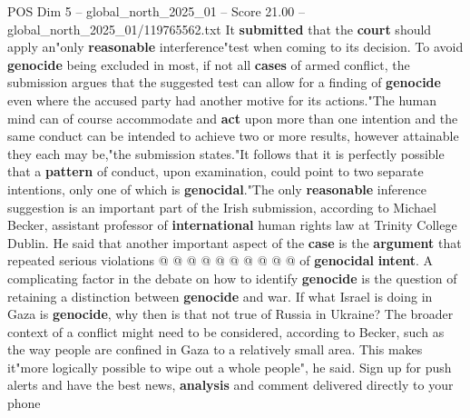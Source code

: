 \begin{textsample}{POS Dim 5 – global\_north\_2025\_01 – Score 21.00 – global\_north\_2025\_01/119765562.txt}
It \textbf{submitted} that the \textbf{court} should apply an"only \textbf{reasonable} interference"test when coming to its decision.
To avoid \textbf{genocide} being excluded in most, if not all \textbf{cases} of armed conflict, the submission argues that the suggested test can allow for a finding of \textbf{genocide} even where the accused party had another motive for its actions."The human mind can of course accommodate and \textbf{act} upon more than one intention and the same conduct can be intended to achieve two or more results, however attainable they each may be,"the submission states."It follows that it is perfectly possible that a \textbf{pattern} of conduct, upon examination, could point to two separate intentions, only one of which is \textbf{genocidal}."The only \textbf{reasonable} inference suggestion is an important part of the Irish submission, according to Michael Becker, assistant professor of \textbf{international} human rights law at Trinity College Dublin.
He said that another important aspect of the \textbf{case} is the \textbf{argument} that repeated serious violations @ @ @ @ @ @ @ @ @ @ of \textbf{genocidal} \textbf{intent}.
A complicating factor in the debate on how to identify \textbf{genocide} is the question of retaining a distinction between \textbf{genocide} and war.
If what Israel is doing in Gaza is \textbf{genocide}, why then is that not true of Russia in Ukraine?
The broader context of a conflict might need to be considered, according to Becker, such as the way people are confined in Gaza to a relatively small area.
This makes it"more logically possible to wipe out a whole people", he said.
Sign up for push alerts and have the best news, \textbf{analysis} and comment delivered directly to your phone

\end{textsample}

